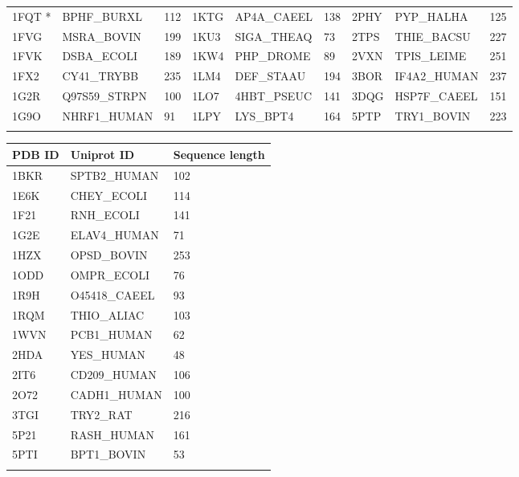 \documentclass{bioinfo}
\begin{document}
\begin{table*}[!t]
{\begin{tabular}{lllllllll}
    1FQT *   & BPHF\_BURXL  & 112             & 1KTG   & AP4A\_CAEEL  & 138             & 2PHY   & PYP\_HALHA   & 125             \\
    1FVG   & MSRA\_BOVIN  & 199             & 1KU3   & SIGA\_THEAQ  & 73              & 2TPS   & THIE\_BACSU  & 227             \\
    1FVK   & DSBA\_ECOLI  & 189             & 1KW4   & PHP\_DROME   & 89              & 2VXN   & TPIS\_LEIME  & 251             \\
    1FX2   & CY41\_TRYBB  & 235             & 1LM4   & DEF\_STAAU   & 194             & 3BOR   & IF4A2\_HUMAN & 237             \\
    1G2R   & Q97S59\_STRPN & 100             & 1LO7   & 4HBT\_PSEUC  & 141             & 3DQG   & HSP7F\_CAEEL & 151             \\
    1G9O   & NHRF1\_HUMAN & 91              & 1LPY   & LYS\_BPT4    & 164             & 5PTP   & TRY1\_BOVIN  & 223             \\ \botrule
\end{tabular}}{}
\end{table*}


\begin{table*}[!t]
{\begin{tabular}{lll}\toprule
    PDB ID & Uniprot ID   & Sequence length \\\midrule
    1BKR   & SPTB2\_HUMAN & 102             \\
    1E6K   & CHEY\_ECOLI  & 114             \\
    1F21   & RNH\_ECOLI   & 141             \\
    1G2E   & ELAV4\_HUMAN & 71              \\
    1HZX   & OPSD\_BOVIN  & 253             \\
    1ODD   & OMPR\_ECOLI  & 76              \\
    1R9H   & O45418\_CAEEL & 93              \\
    1RQM   & THIO\_ALIAC  & 103             \\
    1WVN   & PCB1\_HUMAN  & 62              \\
    2HDA   & YES\_HUMAN   & 48              \\
    2IT6   & CD209\_HUMAN & 106             \\
    2O72   & CADH1\_HUMAN & 100             \\
    3TGI   & TRY2\_RAT    & 216             \\
    5P21   & RASH\_HUMAN  & 161             \\
    5PTI   & BPT1\_BOVIN  & 53              \\\botrule
\end{tabular}}{}
\end{table*}
\end{document}
